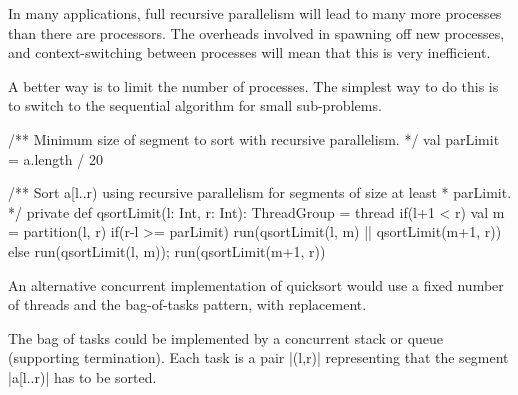 

\begin{slide}

In many applications, full recursive parallelism will lead to many more
processes than there are processors.  The overheads involved in spawning off
new processes, and context-switching between processes will mean that this is
very inefficient.

A better way is to limit the number of processes.  The simplest way to do this
is to switch to the sequential algorithm for small sub-problems.
\end{slide}


\begin{slide}

\begin{scala}
  /** Minimum size of segment to sort with recursive parallelism. */
  val parLimit = a.length / 20

  /** Sort a[l..r) using recursive parallelism for segments of size at least
    * parLimit. */
  private def qsortLimit(l: Int, r: Int): ThreadGroup = thread{
    if(l+1 < r){
      val m = partition(l, r)
      if(r-l >= parLimit) run(qsortLimit(l, m) || qsortLimit(m+1, r))
      else{ run(qsortLimit(l, m)); run(qsortLimit(m+1, r)) }
    }
  }
\end{scala}
\end{slide}


\begin{slide}

An alternative concurrent implementation of quicksort would use a fixed number
of threads and the bag-of-tasks pattern, with replacement.  

The bag of tasks could be implemented by a concurrent stack or queue
(supporting termination).  Each task is a pair |(l,r)| representing that the
segment |a[l..r)| has to be sorted.
\end{slide}



